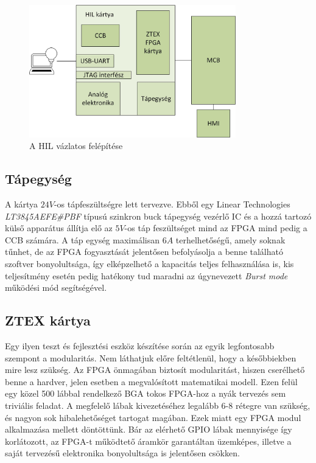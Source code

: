 \begin{figure}[!ht]
	\centering
	\includegraphics[width = 0.8\textwidth]{figures/hil.jpg}
	\caption{A HIL vázlatos felépítése} 
	\label{fig:hil_block}
\end{figure}

\subsection{Tápegység}
A kártya $24 V$-os tápfeszültségre lett tervezve. Ebből egy Linear Technologies \emph{LT3845AEFE#PBF} típusú szinkron buck tápegység vezérlő IC és a hozzá tartozó külső apparátus állítja elő az $5 V$-os táp feszültséget mind az FPGA mind pedig a CCB számára. A táp egység maximálisan $6 A$ terhelhetőségű, amely soknak tűnhet, de az FPGA fogyasztását jelentősen befolyásolja a benne található szoftver bonyolultsága, így elképzelhető a kapacitás teljes felhasználása is, kis teljesítmény esetén pedig hatékony tud maradni az úgynevezett \emph{Burst mode} működési mód segítségével.

\subsection{ZTEX kártya}

Egy ilyen teszt és fejlesztési eszköz készítése során az egyik legfontosabb szempont a modularitás. Nem láthatjuk előre feltétlenül, hogy a későbbiekben mire lesz szükség. Az FPGA önmagában biztosít modularitást, hiszen cserélhető benne a hardver, jelen esetben a megvalósított matematikai modell. Ezen felül egy közel 500 lábbal rendelkező BGA tokos FPGA-hoz a nyák tervezés sem triviális feladat. A megfelelő lábak kivezetéséhez legalább 6-8 rétegre van szükség, és nagyon sok hibalehetőséget tartogat magában. Ezek miatt egy FPGA modul alkalmazása mellett döntöttünk. Bár az elérhető GPIO lábak mennyisége így korlátozott, az FPGA-t működtető áramkör garantáltan üzemképes, illetve a saját tervezésű elektronika bonyolultsága is jelentősen csökken.

